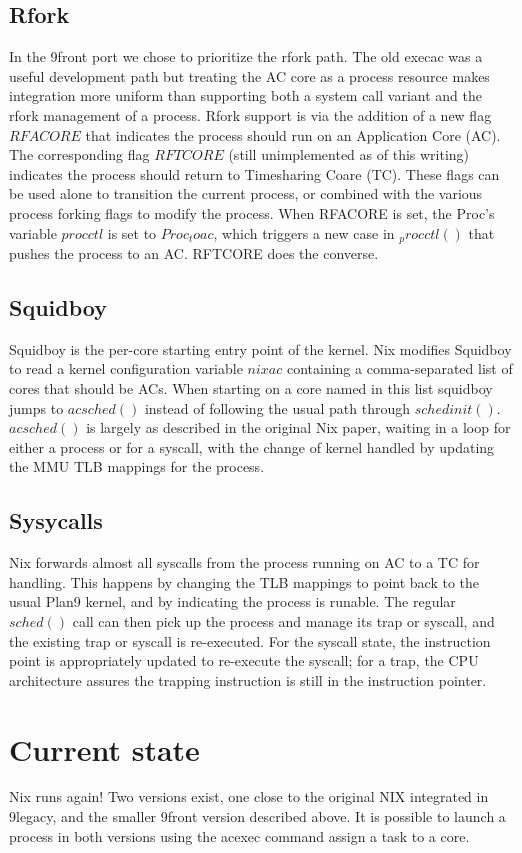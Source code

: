 \documentclass{article}
\begin{document}
\subsection{Rfork}
In the 9front port we chose to prioritize the rfork path.
The old execac was a useful development path but treating the AC core as a process resource makes integration more uniform than supporting both a system call variant and the rfork management of a process.
Rfork support is via the addition of a new flag $RFACORE$ that indicates the process should run on an Application Core (AC).
The corresponding flag $RFTCORE$ (still unimplemented as of this writing) indicates the process should return to Timesharing Coare (TC).
These flags can be used alone to transition the current process, or combined with the various process forking flags to modify the process.
When RFACORE is set, the Proc's variable $procctl$ is set to $Proc_toac$, which triggers a new case in $_procctl()$ that pushes the process to an AC.
RFTCORE does the converse.

\subsection{Squidboy}
Squidboy is the per-core starting entry point of the kernel.
Nix modifies Squidboy to read a kernel configuration variable $nixac$ containing a comma-separated list of cores that should be ACs.
When starting on a core named in this list squidboy jumps to $acsched()$ instead of following the usual path through $schedinit()$.
$acsched()$ is largely as described in the original Nix paper, waiting in a loop for either a process or for a syscall, with the change of kernel handled by updating the MMU TLB mappings for the process.

\subsection{Sysycalls}
Nix forwards almost all syscalls from the process running on AC to a TC for handling.
This happens by changing the TLB mappings to point back to the usual Plan9 kernel, and by indicating the process is runable.
The regular $sched()$ call can then pick up the process and manage its trap or syscall, and the existing trap or syscall is re-executed.
For the syscall state, the instruction point is appropriately updated to re-execute the syscall; for a trap, the CPU architecture assures the trapping instruction is still in the instruction pointer.

\section{Current state}
Nix runs again! 
Two versions exist, one close to the original NIX integrated in 9legacy, and the smaller 9front version described above.
It is possible to launch a process in both versions using the acexec command assign a task to a core.  
\end{document}
